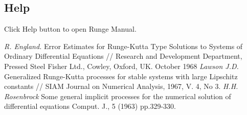 \documentclass[12pt]{article}
\begin{document}
\subsection{Help}

Click Help button  to open Runge Manual.





\begin{thebibliography}{9}
\textit{R. England.} Error Estimates for Runge-Kutta Type Solutions to Systems of 
Ordinary Differential Equations 
// Research and Development Department, Pressed Steel Fisher Ltd., Cowley, Oxford, UK. October 1968
\textit{Lawson J.D.} Generalized Runge-Kutta processes for stable systems with large Lipschitz constants 
// SIAM Journal on Numerical Analysis, 1967, V. 4, No 3.
\textit{H.H. Rosenbrock} Some general implicit processes for the numerical solution of differential equations
Comput. J., 5 (1963) pp.329-330.
\end{thebibliography}

\end{document}
